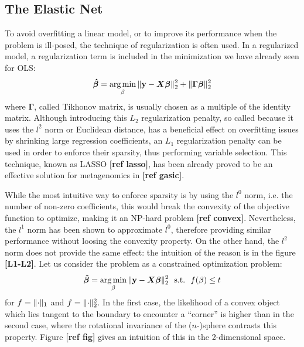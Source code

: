 \subsection{The Elastic Net}

To avoid overfitting a linear model, or to improve its performance when the problem is ill-posed, the technique of regularization is often used. In a regularized model, a regularization term is included in the minimization we have already seen for OLS:
\begin{equation*}
    \boldsymbol{\hat{\beta}} = \operatorname*{arg\,min}_{\beta}{\lVert\mathbf{y} - \boldsymbol{X}\boldsymbol{\beta}\rVert_2^2} + \lVert\boldsymbol{\Gamma}\boldsymbol{\beta}\rVert_2^2
\end{equation*}
where $\boldsymbol{\Gamma}$, called Tikhonov matrix, is usually chosen as a multiple of the identity matrix. Although introducing this $L_2$ regularization penalty, so called because it uses the $l^2$ norm or Euclidean distance, has a beneficial effect on overfitting issues by shrinking large regression coefficients, an $L_1$ regularization penalty can be used in order to enforce their sparsity, thus performing variable selection. This technique, known as LASSO \textbf{[ref lasso]}, has been already proved to be an effective solution for metagenomics in \textbf{[ref gasic]}.

While the most intuitive way to enforce sparsity is by using the $l^0$ norm, i.e. the number of non-zero coefficients, this would break the convexity of the objective function to optimize, making it an NP-hard problem \textbf{[ref convex]}. Nevertheless, the $l^1$ norm has been shown to approximate $l^0$, therefore providing similar performance without loosing the convexity property.
On the other hand, the $l^2$ norm does not provide the same effect: the intuition of the reason is in the figure \textbf{[L1-L2]}. Let us consider the problem as a constrained optimization problem:
\begin{equation*}
    \boldsymbol{\hat{\beta}} = \operatorname*{arg\,min}_{\beta}{\lVert\mathbf{y} - \boldsymbol{X}\boldsymbol{\beta}\rVert_2^2}~~\text{s.t.}~~f(\beta) \leq t
\end{equation*}
for $f=\lVert\cdot\rVert_1$ and $f=\lVert\cdot\rVert_2^2$. In the first case, the likelihood of a convex object which lies tangent to the boundary to encounter a ``corner'' is higher than in the second case, where the rotational invariance of the ($n$-)sphere contrasts this property. Figure \textbf{[ref fig]} gives an intuition of this in the 2-dimensional space.

